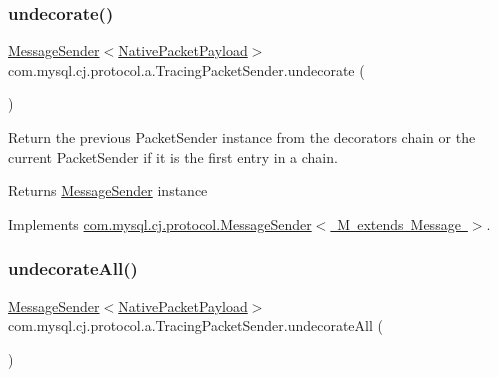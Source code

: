 \subsubsection{\texorpdfstring{undecorate()}{undecorate()}}
{\footnotesize\ttfamily \mbox{\hyperlink{interfacecom_1_1mysql_1_1cj_1_1protocol_1_1_message_sender}{Message\+Sender}}$<$\mbox{\hyperlink{classcom_1_1mysql_1_1cj_1_1protocol_1_1a_1_1_native_packet_payload}{Native\+Packet\+Payload}}$>$ com.\+mysql.\+cj.\+protocol.\+a.\+Tracing\+Packet\+Sender.\+undecorate (\begin{DoxyParamCaption}{ }\end{DoxyParamCaption})}

Return the previous Packet\+Sender instance from the decorators chain or the current Packet\+Sender if it is the first entry in a chain.

\begin{DoxyReturn}{Returns}
\mbox{\hyperlink{interfacecom_1_1mysql_1_1cj_1_1protocol_1_1_message_sender}{Message\+Sender}} instance 
\end{DoxyReturn}


Implements \mbox{\hyperlink{interfacecom_1_1mysql_1_1cj_1_1protocol_1_1_message_sender_a3a352bf35ad98dc6cea7c1f4ac9480da}{com.\+mysql.\+cj.\+protocol.\+Message\+Sender$<$ M extends Message $>$}}.

\mbox{\label{classcom_1_1mysql_1_1cj_1_1protocol_1_1a_1_1_tracing_packet_sender_a57670e7bdafb2dd88cb711fb7e60266d}} 
\subsubsection{\texorpdfstring{undecorate\+All()}{undecorateAll()}}
{\footnotesize\ttfamily \mbox{\hyperlink{interfacecom_1_1mysql_1_1cj_1_1protocol_1_1_message_sender}{Message\+Sender}}$<$\mbox{\hyperlink{classcom_1_1mysql_1_1cj_1_1protocol_1_1a_1_1_native_packet_payload}{Native\+Packet\+Payload}}$>$ com.\+mysql.\+cj.\+protocol.\+a.\+Tracing\+Packet\+Sender.\+undecorate\+All (\begin{DoxyParamCaption}{ }\end{DoxyParamCaption})}

